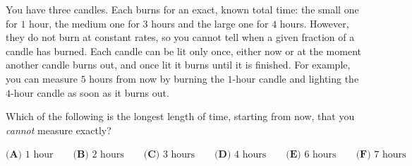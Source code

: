 You have three candles. Each burns for an exact, known total time: the small one for $1$ hour, the medium one for $3$ hours and the large one for $4$ hours. However, they do not burn at constant rates, so you cannot tell when a given fraction of a candle has burned. Each candle can be lit only once, either now or at the moment another candle burns out, and once lit it burns until it is finished. For example, you can measure $5$ hours from now by burning the $1$-hour candle and lighting the $4$-hour candle as soon as it burns out.

Which of the following is the longest length of time, starting from now, that you \emph{cannot} measure exactly?

$\textbf{(A) }1\text{ hour}\qquad\textbf{(B) }2\text{ hours}\qquad\textbf{(C) }3\text{ hours}\qquad\textbf{(D) }4\text{ hours}\qquad\textbf{(E) }6\text{ hours}\qquad\textbf{(F) }7\text{ hours}$
